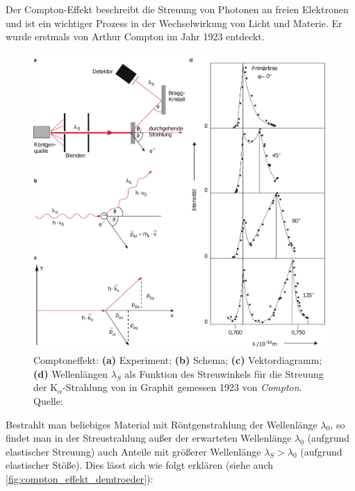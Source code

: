 \documentclass[ngerman]{scrartcl}
\begin{document}
Der Compton-Effekt beschreibt die Streuung von Photonen an freien Elektronen und ist ein wichtiger Prozess in der Wechselwirkung von Licht und Materie. Er wurde erstmals von Arthur Compton im Jahr 1923 entdeckt.
%
\begin{figure}[!h]
    \centering
    \begin{samepage}
        \includegraphics[width=0.8\linewidth]{fig/compton_complete.pdf}
        \caption[Compton-Effekt]{Comptoneffekt: \textbf{(a)} Experiment; \textbf{(b)} Schema; \textbf{(c)} Vektordiagramm; \textbf{(d)} Wellenlängen $\lambda_S$ als Funktion des Streuwinkels für die Streuung der K$_\alpha$-Strahlung
            von  in Graphit gemessen 1923 von \textit{Compton}. Quelle: \cite{ref:demtroeder}}
        \label{fig:compton_effekt_demtroeder}
    \end{samepage}
\end{figure}
%
Bestrahlt man beliebiges Material mit Röntgenstrahlung der Wellenlänge $\lambda_0$, so findet man in der Streustrahlung außer der erwarteten Wellenlänge $\lambda_0$ (aufgrund elastischer Streuung) auch Anteile mit größerer Wellenlänge $\lambda_S > \lambda_0$ (aufgrund elastischer Stöße). Dies lässt sich wie folgt erklären (siehe auch \autoref{fig:compton_effekt_demtroeder}):
\end{document}

